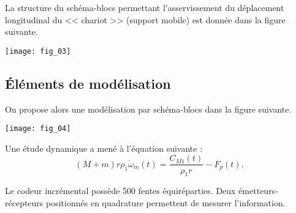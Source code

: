 La structure du schéma-blocs permettant l'asservissement du déplacement longitudinal du << chariot >> (support mobile) est donnée dans la figure suivante.


\begin{center}
\texttt{[image: fig\_03]}
\end{center}

\fi

\subsection*{Éléments de modélisation}

\ifprof
\else


On propose alors une modélisation par schéma-blocs dans la figure suivante. 
\begin{center}
\texttt{[image: fig\_04]}
\end{center}

Une étude dynamique a mené à l'équation suivante : 
$$\left(M+m\right)r\rho_1 \dot{\omega}_m(t)=\dfrac{C_{M1}(t)}{\rho_1 r}-F_p(t).$$

Le codeur incrémental possède 500 fentes équiréparties. Deux émetteurs-récepteurs positionnés en quadrature permettent de mesurer l'information. 
\fi

